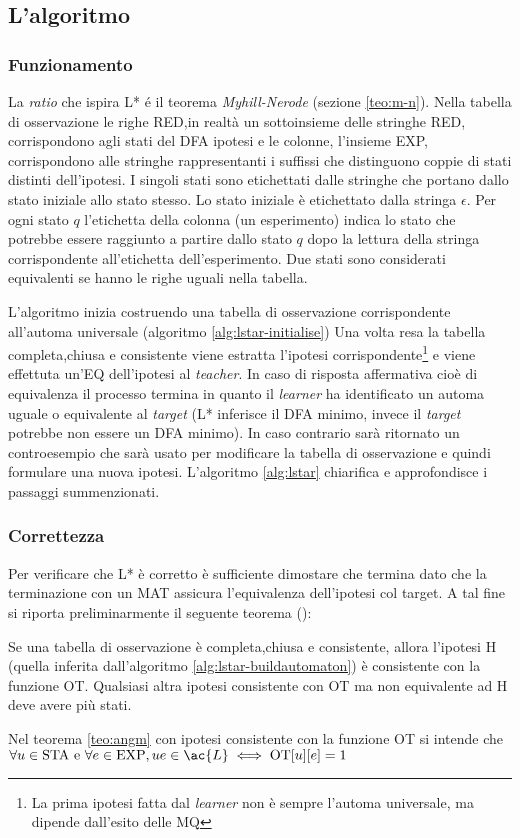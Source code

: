 \subsection{L'algoritmo}
\subsubsection{Funzionamento}La \textit{ratio} che ispira L* é il teorema \textit{Myhill-Nerode} (sezione \ref{teo:m-n}). Nella tabella di osservazione le righe RED,in realtà un sottoinsieme delle stringhe RED, corrispondono agli stati del DFA ipotesi e le colonne, l'insieme EXP, corrispondono alle stringhe rappresentanti i suffissi che distinguono coppie di stati distinti dell'ipotesi. I singoli stati sono etichettati dalle stringhe che portano dallo stato iniziale allo stato stesso. Lo stato iniziale è etichettato dalla stringa $\epsilon$. Per ogni stato $q$ l'etichetta della colonna (un esperimento) indica lo stato che potrebbe essere raggiunto a partire dallo stato $q$ dopo la lettura della stringa corrispondente all'etichetta dell'esperimento. Due stati sono considerati equivalenti se hanno le righe uguali nella tabella.

L'algoritmo inizia costruendo una tabella di osservazione corrispondente all'automa universale (algoritmo \ref{alg:lstar-initialise})
Una volta resa la tabella completa,chiusa e consistente viene estratta l'ipotesi corrispondente\footnote{La prima ipotesi fatta dal \textit{learner} non è sempre l'automa universale, ma dipende dall'esito delle \ac{MQ}} e viene effettuta un'\ac{EQ} dell'ipotesi al \textit{teacher}. In caso di risposta affermativa cioè di equivalenza il processo termina in quanto il \textit{learner} ha identificato un automa uguale o equivalente al \textit{target} (L* inferisce il DFA minimo, invece il \textit{target} potrebbe non essere un DFA minimo). In caso contrario sarà ritornato un controesempio che sarà usato per modificare la tabella di osservazione e quindi formulare una nuova ipotesi. L'algoritmo \ref{alg:lstar} chiarifica e approfondisce i passaggi summenzionati.

\subsubsection{Correttezza}
\label{sub:cor}
Per verificare che L* è corretto è sufficiente dimostare che termina dato che la terminazione con un  \ac{MAT} assicura l'equivalenza dell'ipotesi col target.
A tal fine si riporta preliminarmente il seguente teorema (\cite{Angluin87}):
\begin{teorema}
\label{teo:angm}
Se una tabella di osservazione è completa,chiusa e consistente, allora l'ipotesi \ac{H} (quella inferita dall'algoritmo \ref{alg:lstar-buildautomaton}) è consistente con la funzione OT. Qualsiasi altra ipotesi consistente con OT ma non equivalente ad \ac{H} deve avere più stati.
\end{teorema}
Nel teorema \ref{teo:angm} con ipotesi consistente con la funzione OT si intende che $\forall u \in \text{STA e } \forall e \in \text{EXP},  ue \in \ac{L} \iff \text{OT}[u][e] = 1$

